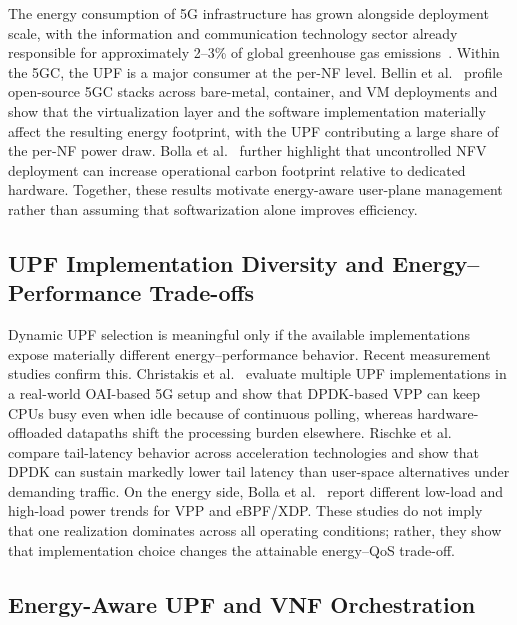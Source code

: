 \documentclass[a4paper,fleqn]{cas-sc}
\begin{document}
The energy consumption of 5G infrastructure has grown alongside deployment scale, with the information and communication technology sector already responsible for approximately 2--3\% of global greenhouse gas emissions~\cite{freitag2021patterns}. Within the 5GC, the UPF is a major consumer at the per-NF level. Bellin et al.~\cite{bellin2023netsoft,bellin2024comnet} profile open-source 5GC stacks across bare-metal, container, and VM deployments and show that the virtualization layer and the software implementation materially affect the resulting energy footprint, with the UPF contributing a large share of the per-NF power draw. Bolla et al.~\cite{bolla2017icc} further highlight that uncontrolled NFV deployment can increase operational carbon footprint relative to dedicated hardware. Together, these results motivate energy-aware user-plane management rather than assuming that softwarization alone improves efficiency.

\subsection{UPF Implementation Diversity and Energy--Performance Trade-offs}
\label{subsec:rel_upf_impl}

Dynamic UPF selection is meaningful only if the available implementations expose materially different energy--performance behavior. Recent measurement studies confirm this. Christakis et al.~\cite{christakis2024infocom} evaluate multiple UPF implementations in a real-world OAI-based 5G setup and show that DPDK-based VPP can keep CPUs busy even when idle because of continuous polling, whereas hardware-offloaded datapaths shift the processing burden elsewhere. Rischke et al.~\cite{rischke2022nfvsdn} compare tail-latency behavior across acceleration technologies and show that DPDK can sustain markedly lower tail latency than user-space alternatives under demanding traffic. On the energy side, Bolla et al.~\cite{bolla2024greencom} report different low-load and high-load power trends for VPP and eBPF/XDP. These studies do not imply that one realization dominates across all operating conditions; rather, they show that implementation choice changes the attainable energy--QoS trade-off.

\subsection{Energy-Aware UPF and VNF Orchestration}
\label{subsec:rel_nonlearning}
\end{document}
